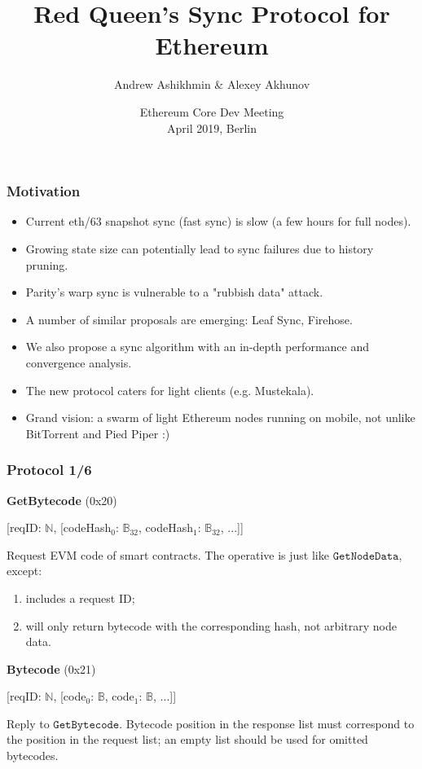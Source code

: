 \documentclass{beamer}
\title{Red Queen's Sync Protocol for Ethereum}
\author{Andrew Ashikhmin \& Alexey Akhunov}
\date{Ethereum Core Dev Meeting\\ April 2019, Berlin}
\begin{document}
  \frame{\titlepage}

  \begin{frame}
    \frametitle{Motivation}
    \begin{itemize}
      \item Current eth/63 snapshot sync (fast sync) is slow (a few hours for full nodes).
      \item Growing state size can potentially lead to sync failures due to history pruning.
      \item Parity's warp sync is vulnerable to a "rubbish data" attack.
      \item A number of similar proposals are emerging: Leaf Sync, Firehose.
      \item We also propose a sync algorithm with an in-depth performance and convergence analysis.
      \item The new protocol caters for light clients (e.g. Mustekala).
      \item Grand vision: a swarm of light Ethereum nodes running on mobile, not unlike BitTorrent and Pied Piper :)
      \end{itemize}
  \end{frame}

  \begin{frame}
    \frametitle{Protocol 1/6}

    \textbf{GetBytecode} (0x20)

    [reqID: $\mathbb{N}$,
    [codeHash$_0$: $\mathbb{B}_{32}$, codeHash$_1$: $\mathbb{B}_{32}$, ...]]
    \medskip
    
    Request EVM code of smart contracts.
    The operative is just like $\texttt{GetNodeData}$, except:
    \begin{enumerate}
    \item includes a request ID;
    \item will only return bytecode with the corresponding hash, not arbitrary node data.
    \end{enumerate}
    \bigskip
    
    \textbf{Bytecode} (0x21)
    
    [reqID: $\mathbb{N}$,
    [code$_0$: $\mathbb{B}$, code$_1$: $\mathbb{B}$, ...]]
    \medskip
    
    Reply to $\texttt{GetBytecode}$.
    Bytecode position in the response list must correspond to the position in the request list;
    an empty list should be used for omitted bytecodes.

  \end{frame}
\end{document}
